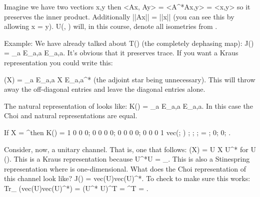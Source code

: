 Imagine we have two vectiors x,y \element \scriptx then <Ax, Ay> =
<A^*Ax,y> = <x,y> so it preserves the inner product. Additionally ||Ax||
= ||x|| (you can see this by allowing x = y). U(\scriptx, \scripty)
will, in this course, denote all isometries from \scriptx \mapsto
\scripty.

Example: We have already talked about \Delta \element T(\scriptx) (the
completely dephasing map): J(\Delta) = \sum_{a\element \Sigma} E_{a,a}
\tensor E_{a,a}. It's obvious that it preserves trace. If you want a
Kraus representation you could write this:

\Delta(X) = \sum_{a \element \Sigma} E_{a,a} X E_{a,a}^* (the adjoint
star being unnecessary). This will throw away the off-diagonal entries
and leave the diagonal entries alone.

The natural representation of \Delta looks like: K(\Delta) =
\sum_{a\element \Sigma} E_{a,a} \tensor E_{a,a}. In this case the Choi
and natural representations are equal.

If X = \mathc^\scriptz then 
K(\Delta) = {1 0 0 0; 0 0 0 0; 0 0 0 0; 0 0 0 1} vec(\alpha \beta;
\gamma \delta)  {\alpha;
\beta; \gamma; \delta} = {\alpha; 0; 0; \delta}.

Consider, now, a unitary channel. That is, one that follows: \Phi(X) = U
X U^* for U \element \mathu(\scriptx). This is a Kraus representation
because U^*U = _\scriptx. This is also a Stinespring
representation where \scriptz is one-dimensional. What does the Choi representation of
this channel look like?
J(\Phi) = vec(U)vec(U)^*. To check to make sure this works: Tr_\scripty
(vec(U)vec(U)^*) = (U^* U)^T = ^T = .
